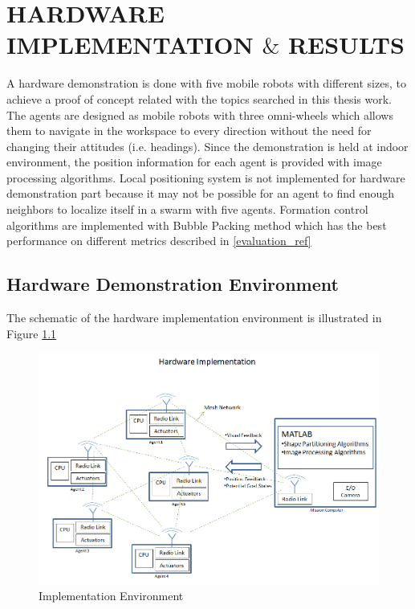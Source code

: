 

\chapter{HARDWARE IMPLEMENTATION $\&$ RESULTS}
\label{chp:hardware}









A hardware demonstration is done with five mobile robots with different sizes, to achieve a proof of concept related with the topics searched in this thesis work. The agents are designed as mobile robots with three omni-wheels which allows them to navigate in the workspace to every direction without the need for changing their attitudes (i.e. headings). Since the demonstration is held at indoor environment, the position information for each agent is provided with image processing algorithms. Local positioning system is not implemented for hardware demonstration part because it may not be possible for an agent to find enough neighbors to localize itself in a swarm with five agents. Formation control algorithms are implemented with Bubble Packing method which has the best performance on different metrics described in \ref{evaluation_ref}

\section{Hardware Demonstration Environment}
The schematic of the hardware implementation environment is illustrated in Figure \ref{harware_ref}
   
\begin{figure}[H]
\caption{Implementation Environment} \label{harware_ref}
\centerline{\includegraphics[scale = 0.55]{hardware}}
\end{figure} 
   
